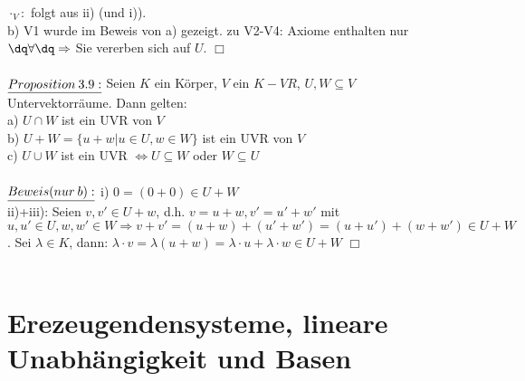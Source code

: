 \documentclass[fleqn, a4paper, 11pt]{article}
\begin{document}
$\cdot_{V}:$ folgt aus ii) (und i)).\\
b) V1 wurde im Beweis von a) gezeigt. zu V2-V4: Axiome enthalten nur $\dq\forall\dq\Rightarrow$ Sie vererben sich auf $U$. \hfill $\Box$\\
\\
$\uline{Proposition\:3.9:}$ Seien $K$ ein K\"orper, $V$ ein $K-VR$, $U,W\subseteq V$ Untervektorr\"aume. Dann gelten:\\
a) $U\cap W$ ist ein UVR von $V$\\
b) $U+W=\{u+w|u\in U,w\in W\}$ ist ein UVR von $V$\\
c) $U\cup W$ ist ein UVR $\Leftrightarrow U\subseteq W$ oder $W\subseteq U$\\
\\
$\uline{Beweis(nur\:b):}$ i) $0=(0+0)\in U+W$\\
ii)+iii): Seien $v,v'\in U+w$, d.h. $v=u+w,v'=u'+w'$ mit $u,u'\in U,w,w'\in W \Rightarrow v+v'=(u+w)+(u'+w')=(u+u')+(w+w')\in U+W$. Sei $\lambda\in K$, dann: $\lambda\cdot v=\lambda(u+w)=\lambda\cdot u+\lambda\cdot w\in U+W$ \hfill $\Box$\\
\\
\newpage
\section{Erezeugendensysteme, lineare Unabh\"angigkeit und Basen}
\end{document}
